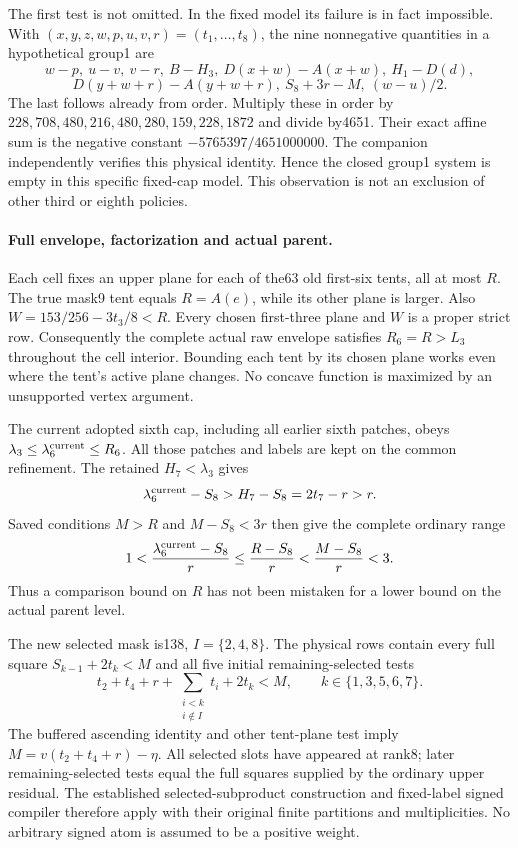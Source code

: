 The first test is not omitted. In the fixed model its failure is
in fact impossible. With $(x,y,z,w,p,u,v,r)=(t_1,\ldots,t_8)$, the
nine nonnegative quantities in a hypothetical group1 are
\[
 w-p,\ u-v,\ v-r,\ B-H_3,\ D(x+w)-A(x+w),\ H_1-D(d),
\]
\[
 D(y+w+r)-A(y+w+r),\ S_8+3r-M,\ (w-u)/2.
\]
The last follows already from order. Multiply these in order by
$228,708,480,216,480,280,159,228,1872$ and divide by4651.
Their exact affine sum is the negative constant
$-5765397/4651000000$. The companion independently verifies this
physical identity. Hence the closed group1 system is empty in this
specific fixed-cap model. This observation is not an exclusion of
other third or eighth policies.

\paragraph{Full envelope, factorization and actual parent.}
Each cell fixes an upper plane for each of the63 old first-six tents,
all at most $R$. The true mask9 tent equals $R=A(e)$, while its other
plane is larger. Also $W=153/256-3t_3/8<R$.
Every chosen first-three plane and $W$ is a proper strict row.
Consequently the complete actual raw envelope satisfies
$R_6=R>L_3$ throughout the cell interior. Bounding each tent by its
chosen plane works even where the tent's active plane changes.
No concave function is maximized by an unsupported vertex argument.

The current adopted sixth cap, including all earlier sixth patches,
obeys $\lambda_3\le\lambda_6^{\rm current}\le R_6$.
All those patches and labels are kept on the common refinement.
The retained $H_7<\lambda_3$ gives
\[
 \lambda_6^{\rm current}-S_8>H_7-S_8=2t_7-r>r.
\]
Saved conditions $M>R$ and $M-S_8<3r$ then give the complete
ordinary range
\[
 1<\frac{\lambda_6^{\rm current}-S_8}{r}
 \le\frac{R-S_8}{r}<\frac{M-S_8}{r}<3.
\]
Thus a comparison bound on $R$ has not been mistaken for a lower
bound on the actual parent level.

The new selected mask is138, $I=\{2,4,8\}$. The physical rows
contain every full square $S_{k-1}+2t_k<M$ and all five initial
remaining-selected tests
\[
 t_2+t_4+r+\sum_{\substack{i<k\\i\notin I}}t_i+2t_k<M,
 \qquad k\in\{1,3,5,6,7\}.
\]
The buffered ascending identity and other tent-plane test imply
$M=v(t_2+t_4+r)-\eta$. All selected slots have appeared at rank8;
later remaining-selected tests equal the full squares supplied by
the ordinary upper residual. The established selected-subproduct
construction and fixed-label signed compiler therefore apply with
their original finite partitions and multiplicities. No arbitrary
signed atom is assumed to be a positive weight.

